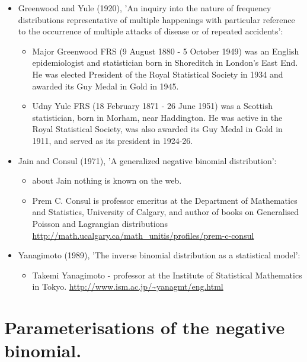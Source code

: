 \begin{itemize}
\item 
Greenwood and Yule (1920), 'An inquiry into the nature of frequency 
distributions representative of multiple happenings with particular 
reference to the occurrence of multiple attacks of disease or of 
repeated accidents':
\begin{itemize}
\item 
Major Greenwood FRS (9 August 1880 - 5 October 1949) was 
an English epidemiologist and statistician born in Shoreditch in 
London's East End. He was elected President of the Royal Statistical 
Society in 1934 and awarded its Guy Medal in Gold in 1945.
\item 
Udny Yule FRS (18 February 1871 - 26 June 1951) was a 
Scottish statistician, born in Morham, near Haddington. He was active 
in the Royal Statistical Society, was also awarded its Guy Medal in Gold 
in 1911, and served as its president in 1924-26.
\end{itemize}
\item 
Jain and Consul (1971), 'A generalized negative binomial distribution':
\begin{itemize}
\item 
about Jain nothing is known on the web.
\item 
Prem C. Consul is professor emeritus at the Department 
of Mathematics and Statistics, University of Calgary, and author of 
books on Generalised Poisson and Lagrangian distributions 
\url{http://math.ucalgary.ca/math_unitis/profiles/prem-c-consul}
\end{itemize}
\item 
Yanagimoto (1989), 'The inverse binomial distribution as a statistical 
model':
\begin{itemize}
\item 
Takemi Yanagimoto - professor at the Institute of 
Statistical Mathematics in Tokyo.
\url{http://www.ism.ac.jp/~yanagmt/eng.html}
\end{itemize}
\end{itemize}

\newpage
\section{Parameterisations of the negative binomial.}
\label{app:sec:NB1discussion}

